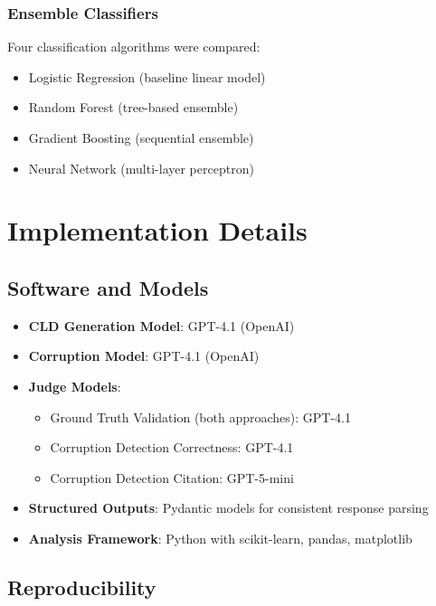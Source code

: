\documentclass{article}
\begin{document}
\subsubsection{Ensemble Classifiers}

Four classification algorithms were compared:
\begin{itemize}
    \item Logistic Regression (baseline linear model)
    \item Random Forest (tree-based ensemble)
    \item Gradient Boosting (sequential ensemble)
    \item Neural Network (multi-layer perceptron)
\end{itemize}

\section{Implementation Details}

\subsection{Software and Models}

\begin{itemize}
    \item \textbf{CLD Generation Model}: GPT-4.1 (OpenAI)
    \item \textbf{Corruption Model}: GPT-4.1 (OpenAI)
    \item \textbf{Judge Models}:
    \begin{itemize}
        \item Ground Truth Validation (both approaches): GPT-4.1
        \item Corruption Detection Correctness: GPT-4.1
        \item Corruption Detection Citation: GPT-5-mini
    \end{itemize}
    \item \textbf{Structured Outputs}: Pydantic models for consistent response parsing
    \item \textbf{Analysis Framework}: Python with scikit-learn, pandas, matplotlib
\end{itemize}

\subsection{Reproducibility}
\end{document}
